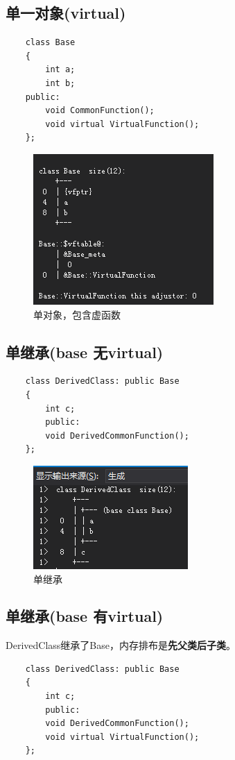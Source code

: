 \documentclass[UTF8,a4paper,12pt]{ctexbook} %
\begin{document}
		\newpage
	\subsection{单一对象(virtual)}
		\begin{lstlisting}
	class Base
	{
		int a;
		int b;
	public:
		void CommonFunction();
		void virtual VirtualFunction();
	};			
		\end{lstlisting}
	
	\begin{figure}[H]
		\centering
		\includegraphics[scale = 0.8]{figure/singleVirtual.png}
		\caption{单对象，包含虚函数}
	\end{figure}

		
		\newpage			   
		\subsection{单继承(base 无virtual)}		   
			\begin{lstlisting}
	class DerivedClass: public Base
	{
		int c;
		public:
		void DerivedCommonFunction();
	};
			\end{lstlisting}
			
			\begin{figure}[H]
				\centering
				\includegraphics[scale = 0.8]{figure/singleDerived.png}
				\caption{单继承}
			\end{figure}
	
		\newpage
		\subsection{单继承(base 有virtual)}DerivedClass继承了Base，内存排布是\textbf{先父类后子类}。
		    \begin{lstlisting}
	class DerivedClass: public Base
	{
		int c;
		public:
		void DerivedCommonFunction();
		void virtual VirtualFunction();
	};	      	
		    \end{lstlisting}
		      
\end{document}
